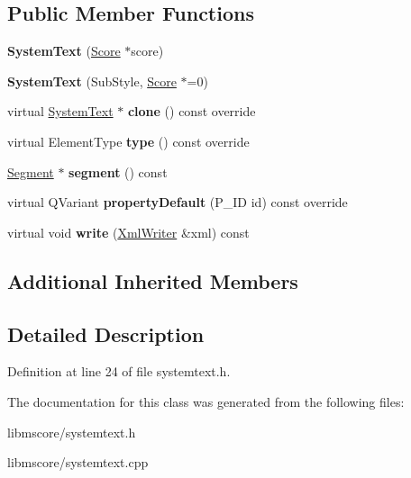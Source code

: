 \subsection*{Public Member Functions}
\begin{DoxyCompactItemize}
\item 
\mbox{\label{class_ms_1_1_system_text_a2de7c5a811facc1f1976f5fcec660329}} 
{\bfseries System\+Text} (\hyperlink{class_ms_1_1_score}{Score} $\ast$score)
\item 
\mbox{\label{class_ms_1_1_system_text_ab7e62fe7869aa5357e50af0a3d716453}} 
{\bfseries System\+Text} (Sub\+Style, \hyperlink{class_ms_1_1_score}{Score} $\ast$=0)
\item 
\mbox{\label{class_ms_1_1_system_text_ac8083ba10444d48b723fd378608ed551}} 
virtual \hyperlink{class_ms_1_1_system_text}{System\+Text} $\ast$ {\bfseries clone} () const override
\item 
\mbox{\label{class_ms_1_1_system_text_aade73fb5e8370cb715c7c7fb587e9e5d}} 
virtual Element\+Type {\bfseries type} () const override
\item 
\mbox{\label{class_ms_1_1_system_text_aedb8331dbe3514cd1682c4a97f754301}} 
\hyperlink{class_ms_1_1_segment}{Segment} $\ast$ {\bfseries segment} () const
\item 
\mbox{\label{class_ms_1_1_system_text_a46a7938fd96ed997e7155c482accc3f9}} 
virtual Q\+Variant {\bfseries property\+Default} (P\+\_\+\+ID id) const override
\item 
\mbox{\label{class_ms_1_1_system_text_a1dcb6514bc3184ba4e5261290d19485d}} 
virtual void {\bfseries write} (\hyperlink{class_ms_1_1_xml_writer}{Xml\+Writer} \&xml) const
\end{DoxyCompactItemize}
\subsection*{Additional Inherited Members}


\subsection{Detailed Description}


Definition at line 24 of file systemtext.\+h.



The documentation for this class was generated from the following files\+:\begin{DoxyCompactItemize}
\item 
libmscore/systemtext.\+h\item 
libmscore/systemtext.\+cpp\end{DoxyCompactItemize}
